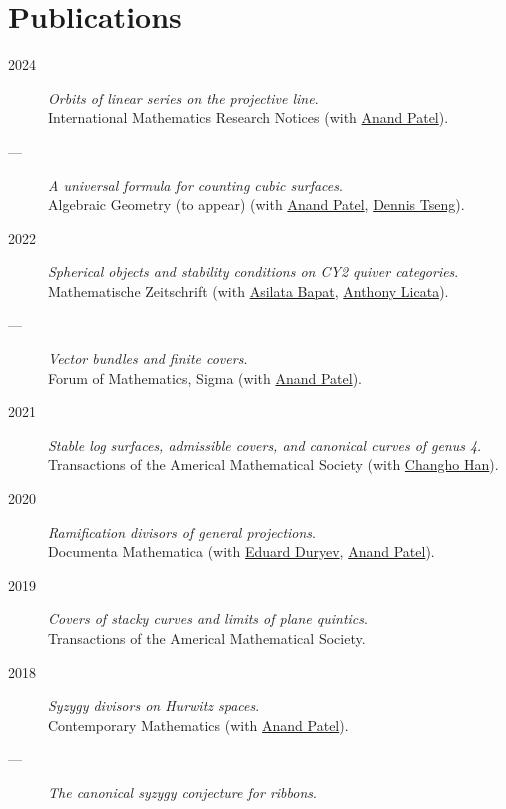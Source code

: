 \documentclass[11pt]{article}
\begin{document}
\section*{Publications}
\label{sec:org5536786}
\label{orgc9bc2c8}
\begin{description}
\item[{2024}] \emph{Orbits of linear series on the projective line}.\\
International Mathematics Research Notices (with \href{https://sites.google.com/view/anand-patel}{Anand Patel}).
\item[{---}] \emph{A universal formula for counting cubic surfaces}.\\
Algebraic Geometry (to appear) (with \href{https://sites.google.com/view/anand-patel}{Anand Patel}, \href{https://sites.google.com/view/dennis-tseng}{Dennis Tseng}).
\item[{2022}] \emph{Spherical objects and stability conditions on CY2 quiver categories}.\\
Mathematische Zeitschrift (with \href{https://asilata.org/}{Asilata Bapat}, \href{https://maths-people.anu.edu.au/\~licatat/}{Anthony Licata}).
\item[{---}] \emph{Vector bundles and finite covers}.\\
Forum of Mathematics, Sigma (with \href{https://sites.google.com/view/anand-patel}{Anand Patel}).
\item[{2021}] \emph{Stable log surfaces, admissible covers, and canonical curves of genus 4}.\\
Transactions of the Americal Mathematical Society (with \href{https://sites.google.com/view/changho-han/}{Changho Han}).
\item[{2020}] \emph{Ramification divisors of general projections}.\\
Documenta Mathematica (with \href{https://eduryev.weebly.com/}{Eduard Duryev}, \href{https://sites.google.com/view/anand-patel}{Anand Patel}).
\item[{2019}] \emph{Covers of stacky curves and limits of plane quintics}.\\
Transactions of the Americal Mathematical Society.
\item[{2018}] \emph{Syzygy divisors on Hurwitz spaces}.\\
Contemporary Mathematics (with \href{https://sites.google.com/view/anand-patel}{Anand Patel}).
\item[{---}] \emph{The canonical syzygy conjecture for ribbons}.\\

\end{description}
\end{document}
